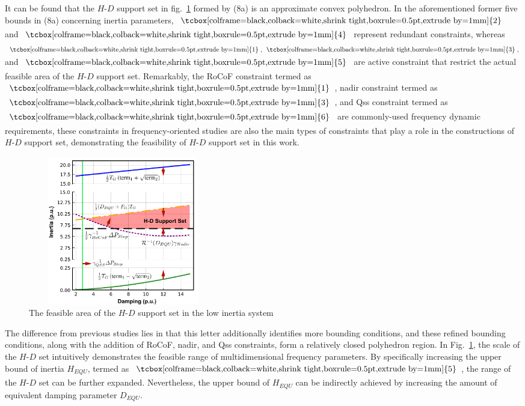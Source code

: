 \documentclass[lettersize,journal]{IEEEtran}
\newcommand{\ciao}[1]{{\setlength\fboxrule{0pt}\fbox{\tcbox[colframe=black,colback=white,shrink tight,boxrule=0.5pt,extrude by=1mm]{\small #1}}}}
\begin{document}
It can be found that the $H$-$D$ support set in fig.~\ref{fig:inertia_damping_supportset} formed by (8a) is an approximate convex polyhedron. In the aforementioned former five bounds in (8a) concerning inertia parameters, $\ciao{2}$ and $\ciao{4}$ represent redundant constraints, whereas $\ciao{1},\,\ciao{3},$ and $\ciao{5}$ are active constraint that restrict the actual feasible area of the $H$-$D$ support set.
Remarkably, the RoCoF constraint termed as $\ciao{1}$, nadir constraint termed as $\ciao{3}$, and Qss constraint termed as $\ciao{6}$ are commonly-used frequency dynamic requirements, these constraints in frequency-oriented studies are also the main types of constraints that play a role in the constructions of $H$-$D$ support set, demonstrating the feasibility of $H$-$D$ support set in this work.

\begin{figure}[!t]\vspace{-0.125cm}
  \centering
  \includegraphics[width=0.4\textwidth,height=6.50cm]{inertia_damping_supportset.pdf}\vspace{-0.125cm}
  \caption{The feasible area of the $H$-$D$ support set in the low inertia system}\vspace{-0.25cm}
  \label{fig:inertia_damping_supportset}
\end{figure}

The difference from previous studies lies in that this letter additionally identifies more bounding conditions, and these refined bounding conditions, along with the addition of RoCoF, nadir, and Qss constraints, form a relatively closed polyhedron region.  In Fig.~\ref{fig:inertia_damping_supportset}, the scale of the $H$-$D$ set intuitively demonstrates the feasible range of multidimensional frequency  parameters. By specifically increasing the upper bound of inertia $H_{EQU}$, termed as $\ciao{5}$, the range of the $H$-$D$ set can be further expanded. Nevertheless, the upper bound of $H_{EQU}$ can be indirectly achieved by increasing the amount of equivalent damping parameter $D_{EQU}$.
\end{document}
